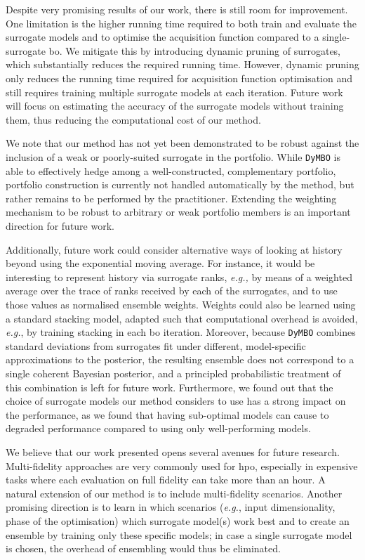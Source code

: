 Despite very promising results of our work, there is still room for improvement.
One limitation is the higher running time required to both train and evaluate the surrogate models and to optimise the acquisition function compared to a single-surrogate \gls{bo}. We mitigate this by introducing dynamic pruning of surrogates, which substantially reduces the required running time.
However, dynamic pruning only reduces the running time required for acquisition function optimisation and still requires training multiple surrogate models at each iteration. Future work will focus on estimating the accuracy of the surrogate models without training them, thus reducing the computational cost of our method.

We
note that our method has not yet been
demonstrated to be robust against the inclusion of a weak or poorly-suited surrogate in the portfolio.
While \texttt{DyMBO} is able to effectively hedge among a well-constructed, complementary portfolio, portfolio construction is currently not handled automatically by the method, but rather remains to be performed by the practitioner.
Extending the weighting mechanism to be robust to arbitrary or weak portfolio members is an important direction for future work.

Additionally, future work could consider alternative ways of looking at history beyond using the exponential moving average. For instance, it would be interesting to represent history via surrogate ranks, \emph{e.g.,} by means of a weighted average over the trace of ranks received by each of the surrogates, and to use those values as normalised ensemble weights.
Weights could also be learned using a standard stacking model, adapted such that computational overhead is avoided, \emph{e.g.},  by training stacking in each \gls{bo} iteration.
Moreover, because \texttt{DyMBO} combines standard deviations from surrogates fit under different, model-specific approximations to the posterior, the resulting ensemble does not correspond to a single coherent Bayesian posterior, and a principled probabilistic treatment of this combination is left for future work.
Furthermore, we found out that the choice of surrogate models our method considers to use has a strong impact on the performance, as we found that having sub-optimal models can cause to degraded performance compared to using only well-performing models.

We believe that our work presented opens several avenues for future research.
Multi-fidelity approaches are very commonly used for \gls{hpo}, especially in expensive tasks where each evaluation on full fidelity can take more than an hour.
A natural extension of our method is to include multi-fidelity scenarios.
Another promising direction is to learn in which scenarios (\emph{e.g.}, input dimensionality, phase of the optimisation) which surrogate model(s) work best and to create an ensemble by training only these specific models;
in case a single surrogate model is chosen, the overhead of ensembling would thus be eliminated.

